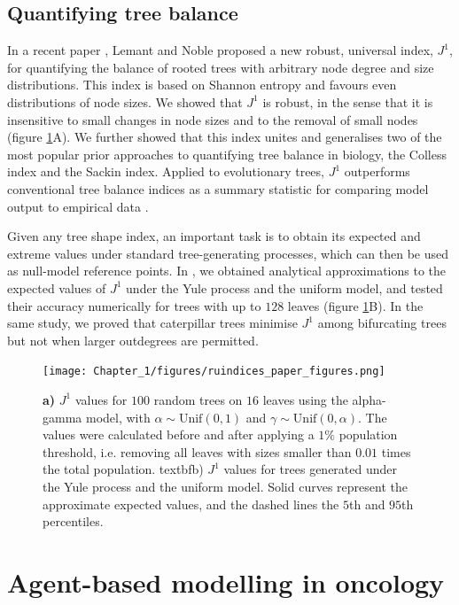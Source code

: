 \subsection{Quantifying tree balance}
In a recent paper \cite{lemant_robust_2022}, Lemant and Noble proposed a new robust, universal index, $J^1$, for quantifying the
balance of rooted trees with arbitrary node degree and size distributions. This index is based on
Shannon entropy and favours even distributions of node sizes. We showed that $J^1$ is robust, in the sense
that it is insensitive to small changes in node sizes and to the removal of small nodes (figure \ref{fig:robustness}A).
We further showed that this index unites and generalises two of the most
popular prior approaches to quantifying tree balance in biology, the Colless index and the Sackin index.
Applied to evolutionary trees, $J^1$ outperforms conventional tree balance indices as a summary statistic
for comparing model output to empirical data \cite{noble_spatial_2022}.\par
Given any tree shape index, an important task is to obtain its expected and extreme values under standard
tree-generating processes, which can then be used as null-model reference points. In \cite{lemant_robust_2022}, we
obtained analytical approximations to the expected values of $J^1$ under the Yule process and the uniform
model, and tested their accuracy numerically for trees with up to $128$ leaves (figure \ref{fig:robustness}B). In the
same study, we proved that caterpillar trees minimise $J^1$ among bifurcating trees but not when larger
outdegrees are permitted.\par

\begin{figure}
    \centering
    \texttt{[image: Chapter\_1/figures/ruindices\_paper\_figures.png]}
    \caption{\textbf{a)} $J^1$ values for $100$ random trees on $16$ leaves using the alpha-gamma model,
    with $\alpha\sim \text{Unif}(0,1)$ and $\gamma\sim \text{Unif}(0,\alpha)$. The values were
    calculated before and after applying a $1\%$ population threshold, i.e. removing all leaves
    with sizes smaller than $0.01$ times the total population. textbf{b)} $J^1$ values
    for trees generated under the Yule process and the uniform model. Solid curves represent the approximate
    expected values, and the dashed lines the $5$th and $95$th percentiles.}
    \label{fig:robustness}
\end{figure}


\section{Agent-based modelling in oncology}

